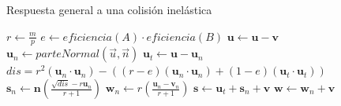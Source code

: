{\centering
\begin{minipage}{\linewidth}
  \begin{algorithm}[H]
    \caption{Respuesta general a una colisión inelástica}
    \label{alg:inelas}
    \begin{algorithmic}[1] %
\State $r \gets \frac{m}{p}$
\State $e \gets eficiencia(A) \cdot eficiencia(B)$
\State $\textbf{u} \gets \textbf{u} - \textbf{v}$
\State $\textbf{u}_n \gets parteNormal(\vec{u}, \vec{n})$
\State $\textbf{u}_t \gets \textbf{u} - \textbf{u}_n$
\State $ dis = r^{2} \left(  \textbf{u}_n \cdot \textbf{u}_n \right) - \left( (r - e) (\textbf{u}_n \cdot \textbf{u}_n) + (1 - e) (\textbf{u}_t \cdot \textbf{u}_t) \right) $
\State $\textbf{s}_n \gets \textbf{n} \left( \frac{ \sqrt{dis} - r \textbf{u}_n }{r + 1} \right) $
\State $\textbf{w}_n \gets r \left( \frac{\textbf{u}_n - \textbf{v}_n}{r + 1} \right) $
\State $\textbf{s} \gets \textbf{u}_t + \textbf{s}_n + \textbf{v}$
\State $\textbf{w} \gets \textbf{w}_n + \textbf{v}$
    \end{algorithmic}
  \end{algorithm}
\end{minipage}
\par
}
